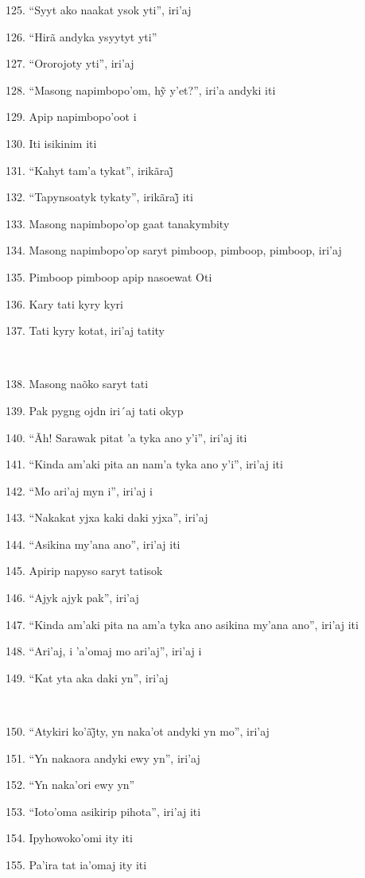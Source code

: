 125. ``Syyt ako naakat ysok yti'', iri'aj

126. ``Hirã andyka ysyytyt yti''

127. ``Ororojoty yti'', iri'aj

128. ``Masong napimbopo’om, hỹ y’et?'', iri’a andyki iti

129. Apip napimbopo'oot i

130. Iti isikinim iti

131. ``Kahyt tam’a tykat'', irikãraj̃

132. ``Tapynsoatyk tykaty'', irikãraj̃ iti

133. Masong napimbopo'op gaat tanakymbity

134. Masong napimbopo'op saryt pimboop, pimboop, pimboop, iri'aj

135. Pimboop pimboop apip nasoewat Oti

136. Kary tati kyry kyri

137. Tati kyry kotat, iri'aj tatity

~

138. Masong naõko saryt tati

139. Pak pygng ojdn iri´aj tati okyp

140. ``Ãh! Sarawak pitat 'a tyka ano y'i'', iri'aj iti

141. ``Kinda am'aki pita an nam'a tyka ano y'i'', iri'aj iti

142. ``Mo ari'aj myn i'', iri'aj i

143. ``Nakakat yjxa kaki daki yjxa'', iri'aj

144. ``Asikina my'ana ano'', iri'aj iti

145. Apirip napyso saryt tatisok

146. ``Ajyk ajyk pak'', iri'aj

147. ``Kinda am'aki pita na am'a tyka ano asikina my'ana ano'', iri'aj iti

148. ``Ari'aj, i 'a'omaj mo ari'aj'', iri'aj i

149. ``Kat yta aka daki yn'', iri'aj

~

150. ``Atykiri ko’ãj̃ty, yn naka’ot andyki yn mo'', iri’aj

151. ``Yn nakaora andyki ewy yn'', iri'aj

152. ``Yn naka'ori ewy yn''

153. ``Ioto'oma asikirip pihota'', iri'aj iti

154. Ipyhowoko'omi ity iti

155. Pa'ira tat ia'omaj ity iti

